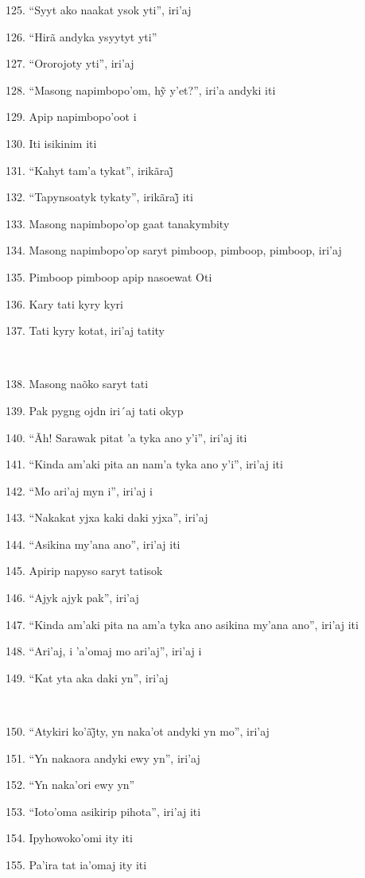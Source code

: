 125. ``Syyt ako naakat ysok yti'', iri'aj

126. ``Hirã andyka ysyytyt yti''

127. ``Ororojoty yti'', iri'aj

128. ``Masong napimbopo’om, hỹ y’et?'', iri’a andyki iti

129. Apip napimbopo'oot i

130. Iti isikinim iti

131. ``Kahyt tam’a tykat'', irikãraj̃

132. ``Tapynsoatyk tykaty'', irikãraj̃ iti

133. Masong napimbopo'op gaat tanakymbity

134. Masong napimbopo'op saryt pimboop, pimboop, pimboop, iri'aj

135. Pimboop pimboop apip nasoewat Oti

136. Kary tati kyry kyri

137. Tati kyry kotat, iri'aj tatity

~

138. Masong naõko saryt tati

139. Pak pygng ojdn iri´aj tati okyp

140. ``Ãh! Sarawak pitat 'a tyka ano y'i'', iri'aj iti

141. ``Kinda am'aki pita an nam'a tyka ano y'i'', iri'aj iti

142. ``Mo ari'aj myn i'', iri'aj i

143. ``Nakakat yjxa kaki daki yjxa'', iri'aj

144. ``Asikina my'ana ano'', iri'aj iti

145. Apirip napyso saryt tatisok

146. ``Ajyk ajyk pak'', iri'aj

147. ``Kinda am'aki pita na am'a tyka ano asikina my'ana ano'', iri'aj iti

148. ``Ari'aj, i 'a'omaj mo ari'aj'', iri'aj i

149. ``Kat yta aka daki yn'', iri'aj

~

150. ``Atykiri ko’ãj̃ty, yn naka’ot andyki yn mo'', iri’aj

151. ``Yn nakaora andyki ewy yn'', iri'aj

152. ``Yn naka'ori ewy yn''

153. ``Ioto'oma asikirip pihota'', iri'aj iti

154. Ipyhowoko'omi ity iti

155. Pa'ira tat ia'omaj ity iti

